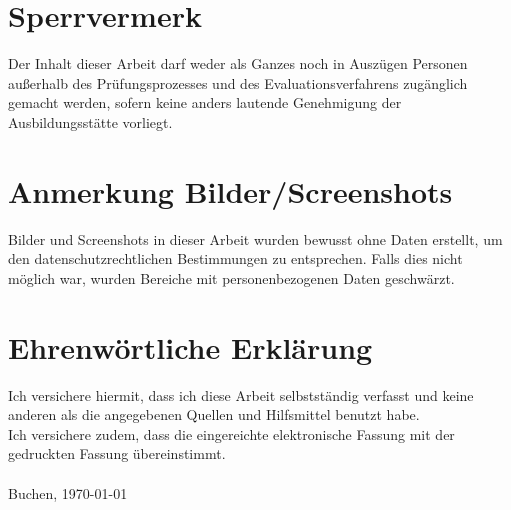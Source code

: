 \begin{titlepage}
    \chapter*{Sperrvermerk}
    \thispagestyle{empty}
    Der Inhalt dieser Arbeit darf weder als Ganzes noch in Auszügen Personen außerhalb des Prüfungsprozesses und des  Evaluationsverfahrens zugänglich gemacht werden, sofern keine anders lautende Genehmigung der Ausbildungsstätte vorliegt.

    \chapter*{Anmerkung Bilder/Screenshots}
    Bilder und Screenshots in dieser Arbeit wurden bewusst ohne Daten erstellt, um den datenschutzrechtlichen Bestimmungen zu entsprechen. Falls dies nicht möglich war, wurden Bereiche mit personenbezogenen Daten geschwärzt.

    \chapter*{Ehrenw\"ortliche Erkl\"arung}

    \thispagestyle{empty}
    Ich versichere hiermit, dass ich diese Arbeit selbstständig verfasst und keine anderen als die angegebenen Quellen und Hilfsmittel benutzt habe. \\
    Ich versichere zudem, dass die eingereichte elektronische Fassung mit der gedruckten Fassung übereinstimmt.\\
    \\
    Buchen, \today
    \newpage
    \vspace{5mm}


\end{titlepage}
